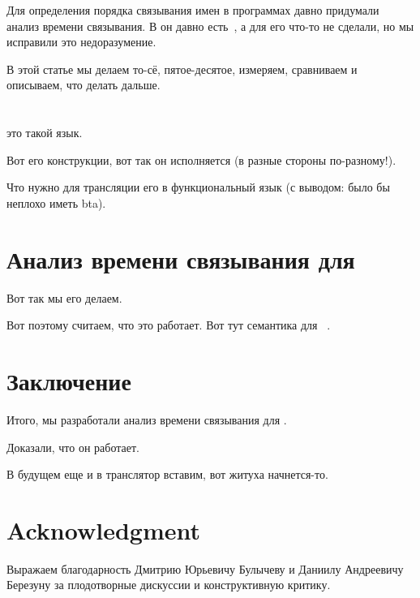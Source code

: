 \documentclass[conference]{IEEEtran}
\begin{document}
Для определения порядка связывания имен в программах давно придумали анализ времени связывания. В \mercury он давно есть~\cite{vanhoof2004binding}, а для \miniKanren его что-то не сделали, но мы исправили это недоразумение.

В этой статье мы делаем то-сё, пятое-десятое, измеряем, сравниваем и описываем, что делать дальше. 



\section{\miniKanren}

\miniKanren это такой язык. 

Вот его конструкции, вот так он исполняется (в разные стороны по-разному!). 

Что нужно для трансляции его в функциональный язык (с выводом: было бы неплохо иметь bta).


\section{Анализ времени связывания для \miniKanren}

Вот так мы его делаем. 

Вот поэтому считаем, что это работает. Вот тут семантика для \miniKanren~\cite{rozplokhas2019certified}.

\section{Заключение}

Итого, мы разработали анализ времени связывания для \miniKanren. 

Доказали, что он работает. 

В будущем еще и в транслятор вставим, вот житуха начнется-то. 


\section*{Acknowledgment}

Выражаем благодарность Дмитрию Юрьевичу Булычеву и Даниилу Андреевичу Березуну за плодотворные дискуссии и конструктивную критику.
 



\end{document}
